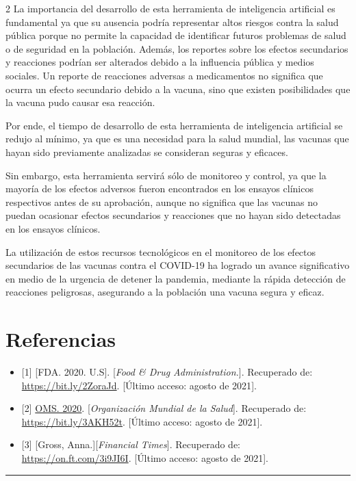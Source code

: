 \documentclass[12pt,spanish,Letterpaper,openany]{book}
\newcommand{\HRule}{\begin{center}\rule{0.5\linewidth}{0.2mm}\end{center}}
\begin{document}
\begin {multicols}{2}
La importancia del desarrollo de esta herramienta de inteligencia artificial es fundamental ya
que su ausencia podría representar altos riesgos contra la salud pública porque no permite la
capacidad de identificar futuros problemas de salud o de seguridad en la población. Además,
los reportes sobre los efectos secundarios y reacciones podrían ser alterados debido a la
influencia pública y medios sociales. Un reporte de reacciones adversas a medicamentos no
significa que ocurra un efecto secundario debido a la vacuna, sino que existen posibilidades
que la vacuna pudo causar esa reacción.

Por ende, el tiempo de desarrollo de esta herramienta de inteligencia artificial se redujo al
mínimo, ya que es una necesidad para la salud mundial, las vacunas que hayan sido
previamente analizadas se consideran seguras y eficaces.

Sin embargo, esta herramienta servirá sólo de monitoreo y control, ya que la mayoría de los
efectos adversos fueron encontrados en los ensayos clínicos respectivos antes de su
aprobación, aunque no significa que las vacunas no puedan ocasionar efectos secundarios y
reacciones que no hayan sido detectadas en los ensayos clínicos.

La utilización de estos recursos tecnológicos en el monitoreo de los efectos secundarios de las
vacunas contra el COVID-19 ha logrado un avance significativo en medio de la urgencia de
detener la pandemia, mediante la rápida detección de reacciones peligrosas, asegurando a la
población una vacuna segura y eficaz.

\hypertarget{referencias-14}{%
\section{Referencias}\label{referencias-14}}

\begin{itemize}
\item
  {[}1{]} {[}FDA. 2020. U.S{]}. {[}\emph{Food \& Drug Administration.}{]}. Recuperado de: \url{https://bit.ly/2ZoraJd}. {[}Último acceso: agosto de 2021{]}.
\item
  {[}2{]} \href{https://www.who.int/}{OMS. 2020}. {[}\emph{Organización Mundial de la Salud}{]}. Recuperado de: \url{https://bit.ly/3AKH52t}. {[}Último acceso: agosto de 2021{]}.
\item
  {[}3{]} {[}Gross, Anna.{]}{[}\emph{Financial Times}{]}. Recuperado de: \url{https://on.ft.com/3i9JI6I}. {[}Último acceso: agosto de 2021{]}.
\end{itemize}

\end {multicols}

\medskip

\HRule

\medskip







\end{document}
